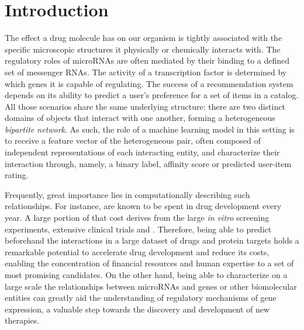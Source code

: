






\section{Introduction}  %

The effect a drug molecule has on our organism is tightly associated with the specific microscopic structures it physically or chemically interacts with. The regulatory roles of microRNAs are often mediated by their binding to a defined set of messenger RNAs. The activity of a transcription factor is determined by which genes it is capable of regulating. The success of a recommendation system depends on its ability to predict a user's preference for a set of items in a catalog.
%
All those scenarios share the same underlying structure: there are two distinct domains of objects that interact with one another, forming a heterogeneous \emph{bipartite network}. As such, the role of a machine learning model in this setting is to receive a feature vector of the heterogeneous pair,
often composed of independent representations of each interacting entity,
and characterize their interaction through, namely, a binary label, affinity score or predicted user-item rating.

Frequently, great importance lies in computationally describing such relationships. For instance, {} are known to be spent in drug development every year. A large portion of that cost derives from the large \textit{in vitro} screening experiments, extensive clinical trials and {}. Therefore, being able to predict beforehand the interactions in a large dataset of drugs and protein targets holds a remarkable potential to accelerate drug development and reduce its costs, enabling the concentration of financial resources and human expertise to a set of most promising candidates. On the other hand, being able to characterize on a large scale the relationships between microRNAs and genes or other biomolecular entities can greatly aid the understanding of regulatory mechanisms of gene expression, a valuable step towards the discovery and development of new therapies. 

